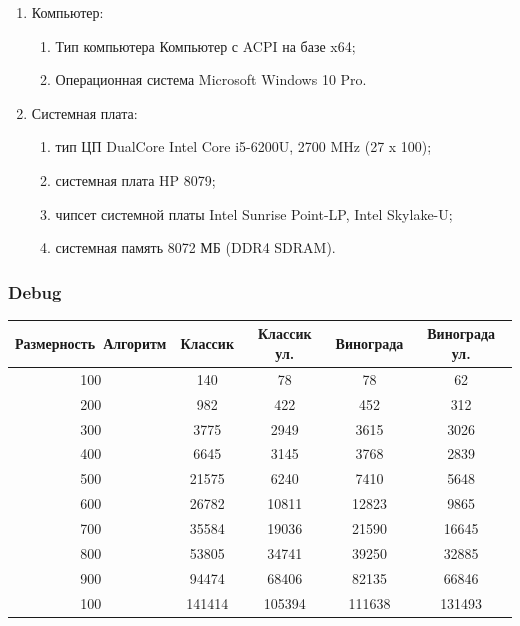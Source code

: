 \documentclass[a4paper, 14pt]{article}
\begin{document}
	\begin{enumerate}
		\item Компьютер:
		\begin{enumerate}
			\item Тип компьютера   Компьютер с ACPI на базе x64;
			\item Операционная система   Microsoft Windows 10 Pro.
		\end{enumerate}
		\item Системная плата:
		\begin{enumerate}
			\item тип ЦП   DualCore Intel Core i5-6200U, 2700 MHz (27 x 100);
			\item системная плата   HP 8079;
			\item чипсет системной платы   Intel Sunrise Point-LP, Intel Skylake-U;
			\item системная память   8072 МБ (DDR4 SDRAM).
		\end{enumerate}
	\end{enumerate}
	
	\subsubsection{Debug}
	
	\begin{tabular}{|c|c|c|c|c|}
		\hline 
		Размерность\ Алгоритм & Классик & Классик ул. & Винограда & Винограда ул. \\ 
		\hline 
		100 & 140 & 78 & 78 & 62 \\ 
		\hline 
		200 & 982 & 422 & 452 & 312 \\ 
		\hline 
		300 & 3775 & 2949 & 3615 & 3026 \\ 
		\hline 
		400 & 6645 & 3145 & 3768 & 2839 \\ 
		\hline 
		500 & 21575 & 6240 & 7410 & 5648 \\ 
		\hline 
		600 & 26782 & 10811 & 12823 & 9865 \\ 
		\hline 
		700 & 35584 & 19036 & 21590 & 16645 \\ 
		\hline 
		800 & 53805 & 34741 & 39250 & 32885 \\ 
		\hline 
		900 & 94474 & 68406 & 82135 & 66846 \\ 
		\hline 
		100 & 141414 & 105394 & 111638 & 131493 \\ 
		\hline 
	\end{tabular} 
\end{document}
